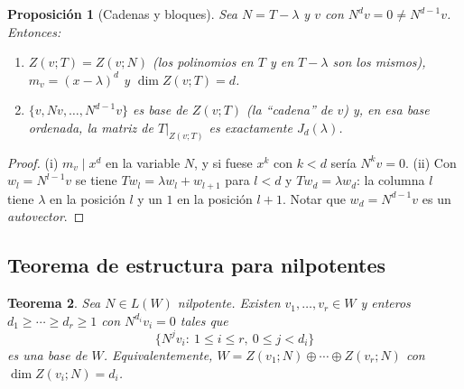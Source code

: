 \documentclass{article}
\theoremstyle{plain}
\newtheorem{teorema}{Teorema}[section]
\newtheorem{proposicion}[teorema]{Proposición}
\theoremstyle{definition}
\theoremstyle{remark}
\begin{document}
\begin{proposicion}[Cadenas y bloques]\label{prop:cadena}
    Sea \(N=T-\lambda\) y \(v\) con \(N^dv=0\ne N^{d-1}v\). Entonces:
    \begin{enumerate}[label=(\roman*)]
        \item \(Z(v;T)=Z(v;N)\) (los polinomios en \(T\) y en \(T-\lambda\) son los mismos), \(m_v=(x-\lambda)^d\) y \(\dim Z(v;T)=d\).
        \item \(\{v,Nv,\dots,N^{d-1}v\}\) es base de \(Z(v;T)\) (la ``cadena'' de \(v\)) y, en esa base ordenada, la matriz de \(T|_{Z(v;T)}\) es exactamente \(J_d(\lambda)\).
    \end{enumerate}
\end{proposicion}
\begin{proof}
    (i) \(m_v\mid x^d\) en la variable \(N\), y si fuese \(x^k\) con \(k<d\) sería \(N^kv=0\). (ii) Con \(w_l=N^{l-1}v\) se tiene \(Tw_l=\lambda w_l+w_{l+1}\) para \(l<d\) y \(Tw_d=\lambda w_d\): la columna \(l\) tiene \(\lambda\) en la posición \(l\) y un \(1\) en la posición \(l+1\). Notar que \(w_d=N^{d-1}v\) es un \emph{autovector}.
\end{proof}

\subsection{Teorema de estructura para nilpotentes}

\begin{teorema}\label{teo:nilp}
    Sea \(N\in L(W)\) nilpotente. Existen \(v_1,\dots,v_r\in W\) y enteros \(d_1\ge\cdots\ge d_r\ge1\) con \(N^{d_i}v_i=0\) tales que
    \[
        \{N^jv_i:\ 1\le i\le r,\ 0\le j<d_i\}
    \]
    es una base de \(W\). Equivalentemente, \(W=Z(v_1;N)\oplus\cdots\oplus Z(v_r;N)\) con \(\dim Z(v_i;N)=d_i\).
\end{teorema}
\end{document}
